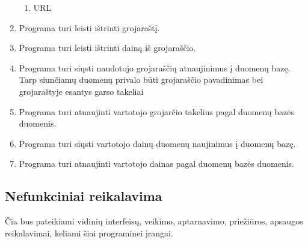 \documentclass{VUMIFPSkursinis}
\begin{document}
\begin{enumerate}[start=1,label={\bfseries FR\arabic*}]
\begin{enumerate}[start=1,label={\bfseries FR10.\arabic*}]
	\item URL
	\end{enumerate}
\item Programa turi leisti ištrinti grojaraštį.
\item Programa turi leisti ištrinti dainą iš grojaraščio.
\item Programa turi siųsti naudotojo grojaraščių atnaujinimus į duomenų bazę. Tarp siunčiamų duomenų privalo būti grojaraščio pavadinimas bei grojaraštyje esantys garso takeliai
\item Programa turi atnaujinti vartotojo grojarčio takelius pagal duomenų bazės duomenis.
\item Programa turi siųsti vartotojo dainų duomenų naujinimus į duomenų bazę.
\item Programa turi atnaujinti vartotojo dainas pagal duomenų bazės duomenis.
\end{enumerate}


\subsection{Nefunkciniai reikalavima}
Čia bus pateikiami vidinių interfeisų, veikimo, aptarnavimo, priežiūros, apsaugos reikalavimai, keliami šiai programinei įrangai.
\end{document}
